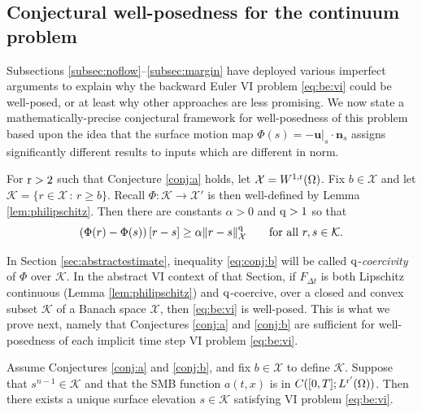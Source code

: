 \documentclass[hidelinks,onefignum,onetabnum,final]{siamart220329}  %
\newcommand{\bn}{\mathbf{n}}
\newcommand{\bu}{\mathbf{u}}
\newcommand{\cK}{\mathcal{K}}
\newcommand{\cX}{\mathcal{X}}
\newcommand{\qq}{{\text{\textnormal{q}}}}
\newcommand{\rr}{{\text{\textnormal{r}}}}
\begin{document}
\subsection{Conjectural well-posedness for the continuum problem} \label{subsec:conjecture} Subsections \ref{subsec:noflow}--\ref{subsec:margin} have deployed various imperfect arguments to explain why the backward Euler VI problem \eqref{eq:be:vi} could be well-posed, or at least why other approaches are less promising.  We now state a mathematically-precise conjectural framework for well-posedness of this problem based upon the idea that the surface motion map $\Phi(s) = -\bu|_s\cdot \bn_s$ assigns significantly different results to inputs which are different in norm.

\begin{conjecture} \label{conj:b}  For $\rr>2$ such that Conjecture \ref{conj:a} holds, let $\cX = W^{1,\rr}(\Omega)$.  Fix $b\in\cX$ and let $\cK=\{r\in\cX\,:\,r\ge b\}$.  Recall $\Phi:\cK\to\cX'$ is then well-defined by Lemma \ref{lem:philipschitz}.  Then there are constants $\alpha>0$ and $\qq>1$ so that
\begin{equation}
\left(\Phi(r) - \Phi(s)\right)[r-s] \ge \alpha \|r-s\|_{\cX}^\qq \qquad \text{for all } r,s\in\cK. \label{eq:conj:b}
\end{equation}
\end{conjecture}

In Section \ref{sec:abstractestimate}, inequality \eqref{eq:conj:b} will be called $\qq$-\emph{coercivity} of $\Phi$ over $\cK$.  In the abstract VI context of that Section, if $F_{\Delta t}$ is both Lipschitz continuous (Lemma \ref{lem:philipschitz}) and $\qq$-coercive, over a closed and convex subset $\cK$ of a Banach space $\cX$, then \eqref{eq:be:vi} is well-posed.  This is what we prove next, namely that Conjectures \ref{conj:a} and \ref{conj:b} are sufficient for well-posedness of each implicit time step VI problem \eqref{eq:be:vi}.

\begin{theorem} \label{thm:stepwellposed}  Assume Conjectures \ref{conj:a} and \ref{conj:b}, and fix $b \in \cX$ to define $\cK$.  Suppose that $s^{n-1}\in\cK$ and that the SMB function $a(t,x)$ is in $C([0,T]; L^{\rr'}(\Omega))$.  Then there exists a unique surface elevation $s\in\cK$ satisfying VI problem \eqref{eq:be:vi}. \end{theorem}
\end{document}
